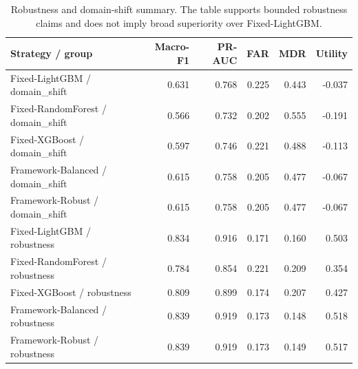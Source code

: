 \begin{table}[!htbp]
\centering
\small
\caption{Robustness and domain-shift summary. The table supports bounded robustness claims and does not imply broad superiority over Fixed-LightGBM.}
\label{tab:robustness-domain}
\begin{tabular}{lrrrrr}
\toprule
Strategy / group & Macro-F1 & PR-AUC & FAR & MDR & Utility \\
\midrule
Fixed-LightGBM / domain\_shift & 0.631 & 0.768 & 0.225 & 0.443 & -0.037 \\
Fixed-RandomForest / domain\_shift & 0.566 & 0.732 & 0.202 & 0.555 & -0.191 \\
Fixed-XGBoost / domain\_shift & 0.597 & 0.746 & 0.221 & 0.488 & -0.113 \\
Framework-Balanced / domain\_shift & 0.615 & 0.758 & 0.205 & 0.477 & -0.067 \\
Framework-Robust / domain\_shift & 0.615 & 0.758 & 0.205 & 0.477 & -0.067 \\
Fixed-LightGBM / robustness & 0.834 & 0.916 & 0.171 & 0.160 & 0.503 \\
Fixed-RandomForest / robustness & 0.784 & 0.854 & 0.221 & 0.209 & 0.354 \\
Fixed-XGBoost / robustness & 0.809 & 0.899 & 0.174 & 0.207 & 0.427 \\
Framework-Balanced / robustness & 0.839 & 0.919 & 0.173 & 0.148 & 0.518 \\
Framework-Robust / robustness & 0.839 & 0.919 & 0.173 & 0.149 & 0.517 \\
\bottomrule
\end{tabular}
\end{table}
